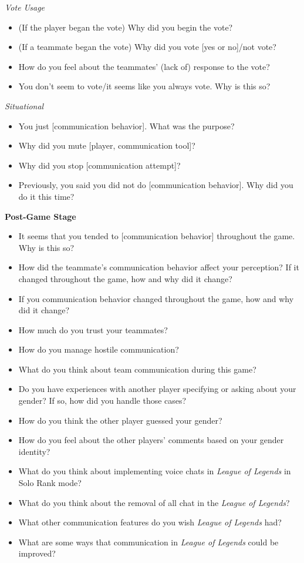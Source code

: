 \textit{Vote Usage}
\begin{itemize}
\item (If the player began the vote) Why did you begin the vote?
\item (If a teammate began the vote) Why did you vote [yes or no]/not vote?
\item How do you feel about the teammates’ (lack of) response to the vote?
\item You don’t seem to vote/it seems like you always vote. Why is this so?
\end{itemize}

\textit{Situational}
\begin{itemize}
\item You just [communication behavior]. What was the purpose?
\item Why did you mute [player, communication tool]?
\item Why did you stop [communication attempt]?
\item Previously, you said you did not do [communication behavior]. Why did you do it this time? 
\end{itemize}


\textbf{Post-Game Stage}
\begin{itemize}
\item It seems that you tended to [communication behavior] throughout the game. Why is this so?
\item How did the teammate’s communication behavior affect your perception? If it changed throughout the game, how and why did it change?
\item If you communication behavior changed throughout the game, how and why did it change?
\item How much do you trust your teammates?
\item How do you manage hostile communication?
\item What do you think about team communication during this game?
\item Do you have experiences with another player specifying or asking about your gender? If so, how did you handle those cases?
\item How do you think the other player guessed your gender?
\item How do you feel about the other players’ comments based on your gender identity?
\item What do you think about implementing voice chats in \textit{League of Legends} in Solo Rank mode?
\item What do you think about the removal of all chat in the \textit{League of Legends}?
\item What other communication features do you wish \textit{League of Legends} had?
\item What are some ways that communication in \textit{League of Legends} could be improved?
\end{itemize}